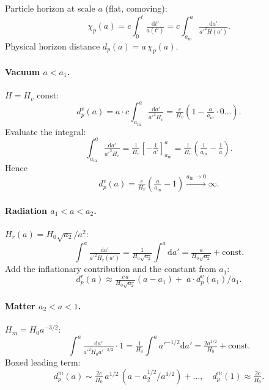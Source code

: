 \documentclass[11pt]{article}
\newcommand{\de}{\mathrm{d}}
\begin{document}
Particle horizon at scale $a$ (flat, comoving):
\[
\chi_p(a) = c\!\int_0^{t}\!\tfrac{\de t'}{a(t')} = c\!\int_{a_{\mathrm{in}}}^{a}\!\tfrac{\de a'}{a'^2 H(a')}.
\]
Physical horizon distance $d_p(a) = a\,\chi_p(a)$.

\paragraph{Vacuum $a<a_1$.} $H=H_v$ const:
\[
d_p^v(a) = a\cdot c\!\int_{a_{\mathrm{in}}}^{a}\!\tfrac{\de a'}{a'^2 H_v} = \tfrac{c}{H_v}\!\left(1-\tfrac{a}{a_{\mathrm{in}}}\cdot 0\dots\right).
\]
Evaluate the integral:
\[
\!\int_{a_{\mathrm{in}}}^{a}\!\tfrac{\de a'}{a'^2 H_v} = \tfrac{1}{H_v}\!\left[-\tfrac{1}{a'}\right]_{a_{\mathrm{in}}}^{a} = \tfrac{1}{H_v}\!\left(\tfrac{1}{a_{\mathrm{in}}}-\tfrac{1}{a}\right).
\]
Hence
\[
\boxed{\;d_p^v(a) = \tfrac{c}{H_v}\!\left(\tfrac{a}{a_{\mathrm{in}}}-1\right)\xrightarrow{a_{\mathrm{in}}\to 0}\infty.\;}
\]

\paragraph{Radiation $a_1<a<a_2$.} $H_r(a)=H_0\sqrt{a_2}/a^2$:
\[
\!\int^{a}\!\tfrac{\de a'}{a'^2 H_r(a')} = \tfrac{1}{H_0\sqrt{a_2}}\!\int^{a}\!\de a' = \tfrac{a}{H_0\sqrt{a_2}} + \text{const}.
\]
Add the inflationary contribution and the constant from $a_1$:
\[
\boxed{\;d_p^r(a) \approx \tfrac{c\,a}{H_0\sqrt{a_2}}\!\left(a-a_1\right)+\;a\cdot d_p^v(a_1)/a_1.\;}
\]

\paragraph{Matter $a_2<a<1$.} $H_m=H_0 a^{-3/2}$:
\[
\!\int^{a}\!\tfrac{\de a'}{a'^2 H_0 a'^{-3/2}}\cdot 1 = \tfrac{1}{H_0}\!\int^{a}\!a'^{-1/2}\de a' = \tfrac{2 a^{1/2}}{H_0} + \text{const}.
\]
Boxed leading term:
\[
\boxed{\;d_p^m(a) \sim \tfrac{2 c}{H_0}\,a^{1/2}\,(a-a_2^{1/2}/a^{1/2})+\dots,\quad d_p^m(1)\approx \tfrac{2c}{H_0}.\;}
\]
\end{document}
